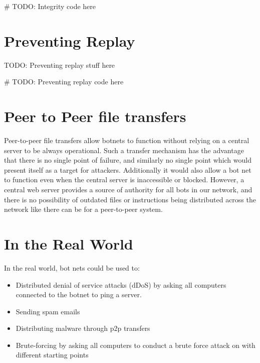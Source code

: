 \documentclass[9pt,a4paper]{article}
\begin{document}
\begin{center}
\vspace{-2ex}
\begin{python}
# TODO: Integrity code here
\end{python}\end{center}

\section{Preventing Replay}
\vspace{-2ex}
TODO: Preventing replay stuff here

\begin{center}
\vspace{-2ex}
\begin{python}
# TODO: Preventing replay code here
\end{python}\end{center}


\section{Peer to Peer file transfers}
\vspace{-2ex}
Peer-to-peer file transfers allow botnets to function without relying on a central server to be always operational. Such a transfer mechanism has the advantage that there is no single point of failure, and similarly no single point which would present itself as a target for attackers. Additionally it would also allow a bot net to function even when the central server is inaccessible or blocked. However, a central web server provides a source of authority for all bots in our network, and there is no possibility of outdated files or instructions being distributed across the network like there can be for a peer-to-peer system.

\section{In the Real World}
\vspace{-2ex}
In the real world, bot nets could be used to:
\begin{itemize}
\item Distributed denial of service attacks (dDoS) by asking all computers connected to the botnet to ping a server.
\item Sending spam emails
\item Distributing malware through p2p transfers
\item Brute-forcing by asking all computers to conduct a brute force attack on with different starting points
\end{itemize}
\end{document}
